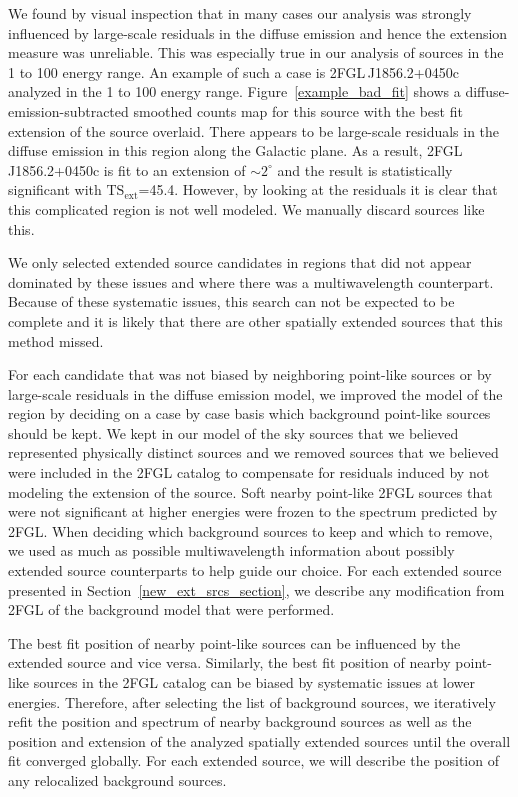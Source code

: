 \documentclass[12pt,preprint]{aastex}
\newcommand{\gev}{\text{GeV}\xspace}
\newcommand{\tsext}{{\ensuremath{\text{TS}_{\text{ext}}}}\xspace}
\newcommand{\degree}{^\circ\xspace}
\begin{document}
We found by visual inspection that in many
cases our analysis was strongly influenced by large-scale residuals in the
diffuse emission and hence the extension measure was unreliable.  This was
especially true in our analysis of sources in the 1 \gev to 100 \gev
energy range.  An example of such a case is 2FGL\,J1856.2+0450c analyzed
in the 1 \gev to 100 \gev energy range. Figure~\ref{example_bad_fit}
shows a diffuse-emission-subtracted smoothed counts map for
this source with the best
fit extension of the source overlaid. There appears to be large-scale
residuals in the diffuse emission in this region along the Galactic plane.
As a result, 2FGL\,J1856.2+0450c is fit to an extension of $\sim2\degree$
and the result is statistically significant with \tsext=45.4. However,
by looking at the residuals it is clear that this complicated region is
not well modeled. We manually discard sources like this.

We only selected extended source
candidates in regions that did not appear dominated by these issues and
where there was a multiwavelength
counterpart. Because of these systematic issues, this search can not be
expected to be complete and it is likely that there are other spatially
extended sources that this method missed.

For each candidate that was not biased by neighboring point-like
sources or by large-scale residuals in the diffuse emission model, we
improved the model of the region by deciding on a case by case basis which
background point-like sources should be kept.  We kept in our model of the sky
sources that we
believed represented physically distinct sources and we removed 
sources that we believed were included in the 2FGL catalog to compensate
for residuals induced by not modeling the extension of the source.
Soft nearby point-like 2FGL sources that were not significant at higher energies
were frozen to the spectrum predicted by 2FGL.
When deciding
which background sources to keep and which to remove, we used as much as possible
multiwavelength information about possibly extended source counterparts
to help guide our choice. For each extended source presented in 
Section~\ref{new_ext_srcs_section}, we describe any modification from 2FGL
of the background model that were performed.

The best fit position of nearby point-like sources can be influenced by
the extended source and vice versa.  Similarly,
the best fit position of nearby point-like sources in the 2FGL catalog can be biased
by systematic issues at lower energies.
Therefore, after selecting the list of background sources, we iteratively
refit the position and spectrum of nearby background sources as well as
the position and extension of the analyzed spatially extended
sources until the overall fit converged globally.  For each extended
source, we will describe the position of any relocalized background
sources.
\end{document}
